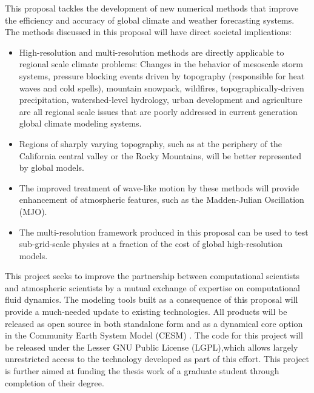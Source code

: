 \documentclass[11pt]{article}
\begin{document}
This proposal tackles the development of new numerical methods that improve the efficiency and accuracy of global climate and weather forecasting systems.  The methods discussed in this proposal will have direct societal implications:
\vspace{-0.4cm}
\begin{itemize}
\item High-resolution and multi-resolution methods are directly applicable to regional scale climate problems: Changes in the behavior of mesoscale storm systems, pressure blocking events driven by topography (responsible for heat waves and cold spells), mountain snowpack, wildfires, topographically-driven precipitation, watershed-level hydrology, urban development and agriculture are all regional scale issues that are poorly addressed in current generation global climate modeling systems.
\item Regions of sharply varying topography, such as at the periphery of the California central valley or the Rocky Mountains, will be better represented by global models.
\item The improved treatment of wave-like motion by these methods will provide enhancement of atmospheric features, such as the Madden-Julian Oscillation (MJO).
\item The multi-resolution framework produced in this proposal can be used to test sub-grid-scale physics at a fraction of the cost of global high-resolution models.
\end{itemize}
\vspace{-0.4cm}
This project seeks to improve the partnership between computational scientists and atmospheric scientists by a mutual exchange of expertise on computational fluid dynamics.  The modeling tools built as a consequence of this proposal will provide a much-needed update to existing technologies.  All products will be released as open source in both standalone form and as a dynamical core option in the Community Earth System Model (CESM) \cite{JWHetal2013BAMS}.  The code for this project will be released under the Lesser GNU Public License (LGPL),which allows largely unrestricted access to the technology developed as part of this effort.  This project is further aimed at funding the thesis work of a graduate student through completion of their degree.
\end{document}
